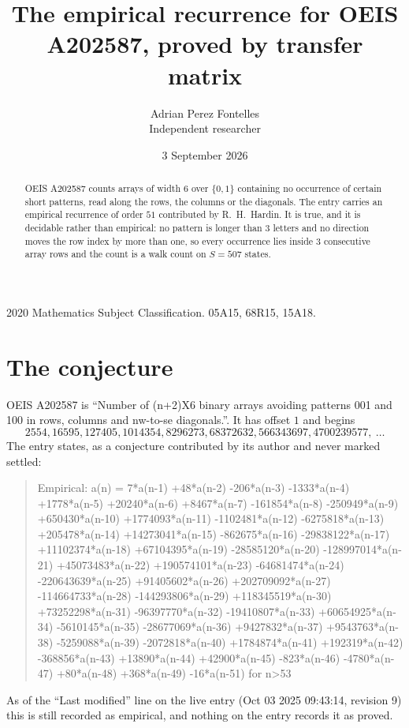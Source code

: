 \documentclass[11pt,a4paper]{article}
\title{The empirical recurrence for OEIS A202587, proved by transfer matrix}
\author{Adrian Perez Fontelles\\ \small Independent researcher}
\date{3 September 2026}
\theoremstyle{plain}
\theoremstyle{definition}
\begin{document}
\maketitle

\begin{abstract}
OEIS A202587 counts arrays of width $6$ over $\{0,1\}$ containing no occurrence of certain short
patterns, read along the rows, the columns or the diagonals. The entry carries an empirical
recurrence of order $51$ contributed by R.~H.~Hardin. It is true, and it is decidable
rather than empirical: no pattern is longer than $3$ letters and no direction moves the row
index by more than one, so every occurrence lies inside $3$ consecutive array rows and the
count is a walk count on $S=507$ states.
\end{abstract}

\noindent\small 2020 Mathematics Subject Classification. 05A15, 68R15, 15A18.\normalsize

\section{The conjecture}

OEIS A202587 is ``Number of (n+2)X6 binary arrays avoiding patterns 001 and 100 in rows, columns and nw-to-se diagonals.''. It has offset $1$ and begins
\[
2554, 16595, 127405, 1014354, 8296273, 68372632, 566343697, 4700239577,\ \dots
\]
The entry states, as a conjecture contributed by its author and never marked settled:
\begin{quote}
Empirical: a(n) = 7*a(n-1) +48*a(n-2) -206*a(n-3) -1333*a(n-4) +1778*a(n-5) +20240*a(n-6) +8467*a(n-7) -161854*a(n-8) -250949*a(n-9) +650430*a(n-10) +1774093*a(n-11) -1102481*a(n-12) -6275818*a(n-13) +205478*a(n-14) +14273041*a(n-15) -862675*a(n-16) -29838122*a(n-17) +11102374*a(n-18) +67104395*a(n-19) -28585120*a(n-20) -128997014*a(n-21) +45073483*a(n-22) +190574101*a(n-23) -64681474*a(n-24) -220643639*a(n-25) +91405602*a(n-26) +202709092*a(n-27) -114664733*a(n-28) -144293806*a(n-29) +118345519*a(n-30) +73252298*a(n-31) -96397770*a(n-32) -19410807*a(n-33) +60654925*a(n-34) -5610145*a(n-35) -28677069*a(n-36) +9427832*a(n-37) +9543763*a(n-38) -5259088*a(n-39) -2072818*a(n-40) +1784874*a(n-41) +192319*a(n-42) -368856*a(n-43) +13890*a(n-44) +42900*a(n-45) -823*a(n-46) -4780*a(n-47) +80*a(n-48) +368*a(n-49) -16*a(n-51) for n>53
\end{quote}
As of the ``Last modified'' line on the live entry (Oct 03 2025 09:43:14, revision 9) this is still
recorded as empirical, and nothing on the entry records it as proved.
\end{document}
